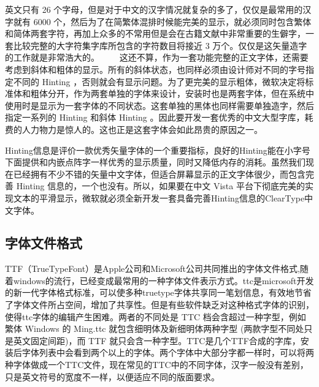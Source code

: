 英文只有 26 个字母，但是对于中文的汉字情况就复杂的多了，仅仅是最常用的汉字就有 6000 个，然后为了在简繁体混排时候能完美的显示，就必须同时包含繁体和简体两套字符，再加上众多的不常用但是会在古籍文献中非常重要的生僻字，一套比较完整的大字符集字库所包含的字符数目将接近 3 万个。仅仅是这矢量造字的工作就是非常浩大的。
　　这还不算，作为一套功能完整的正文字体，还需要考虑到斜体和粗体的显示。所有的斜体状态，也同样必须由设计师对不同的字号指定不同的 Hinting ，否则就会有显示问题。为了更完美的显示粗体，微软决定将标准体和粗体分开，作为两套单独的字体来设计，安装时也是两套字体，但在系统中使用时是显示为一套字体的不同状态。这套单独的黑体也同样需要单独造字，然后指定一系列的 Hinting 和斜体 Hinting 。因此要开发一套优秀的中文大型字库，耗费的人力物力是惊人的。这也正是这套字体会如此昂贵的原因之一。

Hinting信息是评价一款优秀矢量字体的一个重要指标，良好的Hinting能在小字号下面提供和内嵌点阵字一样优秀的显示质量，同时又降低内存的消耗。虽然我们现在已经拥有不少不错的矢量中文字体，但适合屏幕显示的正文字体很少，而包含完善 Hinting 信息的，一个也没有。所以，如果要在中文 Vista 平台下彻底完美的实现文本的平滑显示，微软就必须全新开发一套具备完善Hinting信息的ClearType中文字体。

\subsection{字体文件格式}

TTF（TrueTypeFont）是Apple公司和Microsoft公司共同推出的字体文件格式,随着windows的流行，已经变成最常用的一种字体文件表示方式。ttc是microsoft开发的新一代字体格式标准，可以使多种truetype字体共享同一笔划信息，有效地节省了字体文件所占空间，增加了共享性。但是有些软件缺乏对这种格式字体的识别，使得ttc字体的编辑产生困难。两者的不同处是 TTC 档会含超过一种字型，例如繁体 Windows 的 Ming.ttc 就包含细明体及新细明体两种字型 (两款字型不同处只是英文固定间距)，而 TTF 就只会含一种字型。TTC是几个TTF合成的字库，安装后字体列表中会看到两个以上的字体。两个字体中大部分字都一样时，可以将两种字体做成一个TTC文件，现在常见的TTC中的不同字体，汉字一般没有差别，只是英文符号的宽度不一样，以便适应不同的版面要求。


























